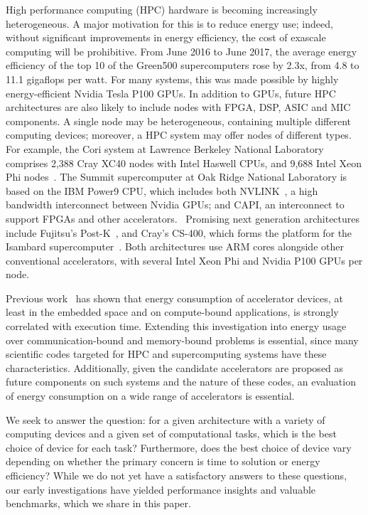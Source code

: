 \documentclass[../document.tex]{subfiles}
\begin{document}
\label{sec:introduction}
	
High performance computing (HPC) hardware is becoming increasingly heterogeneous.
A major motivation for this is to reduce energy use; indeed, without significant improvements in energy efficiency, the cost of exascale computing will be prohibitive.
From June 2016 to June 2017, the average energy efficiency of the top 10 of the Green500 supercomputers rose by 2.3x, from 4.8 to 11.1 gigaflops per watt.\cite{feldman_2017}
For many systems, this was made possible by highly energy-efficient Nvidia Tesla P100 GPUs.
In addition to GPUs, future HPC architectures are also likely to include nodes with FPGA, DSP, ASIC and MIC components.
A single node may be heterogeneous, containing multiple different computing devices; moreover, a HPC system may offer nodes of different types.
For example, the Cori system at Lawrence Berkeley National Laboratory comprises 2,388 Cray XC40 nodes with Intel Haswell CPUs, and 9,688 Intel Xeon Phi nodes~\cite{declerck2016cori}.
The Summit supercomputer at Oak Ridge National Laboratory is based on the IBM Power9 CPU, which includes both NVLINK~\cite{morgan_2016}, a high bandwidth interconnect between Nvidia GPUs; and CAPI, an interconnect to support FPGAs and other accelerators.~\cite{morgan_2017}
Promising next generation architectures include Fujitsu's Post-K~\cite{morgan_2016_postk}, and Cray's CS-400, which forms the platform for the Isambard supercomputer~\cite{feldman_2017_isambard}.
Both architectures use ARM cores alongside other conventional accelerators, with several Intel Xeon Phi and Nvidia P100 GPUs per node.

Previous work~\cite{johnston2017embedded} has shown that energy consumption of accelerator devices, at least in the embedded space and on compute-bound applications, is strongly correlated with execution time.
Extending this investigation into energy usage over communication-bound and memory-bound problems is essential, since many scientific codes targeted for HPC and supercomputing systems have these characteristics.
Additionally, given the candidate accelerators are proposed as future components on such systems and the nature of these codes, an evaluation of energy consumption on a wide range of accelerators is essential.

We seek to answer the question: for a given architecture with a variety of computing devices and a given set of computational tasks, which is the best choice of device for each task?
Furthermore, does the best choice of device vary depending on whether the primary concern is time to solution or energy efficiency?
While we do not yet have a satisfactory answers to these questions, our early investigations have yielded performance insights and valuable benchmarks, which we share in this paper.
\end{document}
